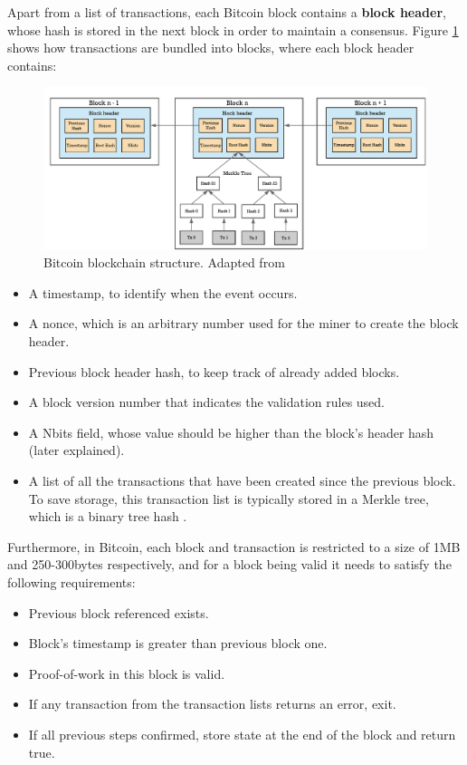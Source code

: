 Apart from a list of transactions, each Bitcoin block contains a \textbf{block header}, whose hash is stored in the next block in order to maintain a consensus. Figure \ref{fig:Bitcoin Blockchain mining} shows how transactions are bundled into blocks, where each block header contains:

\begin{figure}[t]
  	\includegraphics[width=1\linewidth]{gfx/mining}    
  	\caption{Bitcoin blockchain structure. Adapted from \citep{hans2017blockchain}}
  	\label{fig:Bitcoin Blockchain mining}
\end{figure}

\begin{itemize}
	\item A timestamp, to identify when the event occurs.
	\item A nonce, which is an arbitrary number used for the miner to create the block header.
	\item Previous block header hash, to keep track of already added blocks.
	\item A block version number that indicates the validation rules used.
	\item A Nbits field, whose value should be higher than the block's header hash (later explained).
	\item A list of all the transactions that have been created since the previous block. To save storage, this transaction list is typically stored in a Merkle tree, which is a binary tree hash \citep{merkle1987digital}.

\end{itemize}

Furthermore, in Bitcoin, each block and transaction is restricted to a size of 1MB and 250-300bytes respectively, and for a block being valid it needs to satisfy the following requirements:

\begin{itemize}
	\item Previous block referenced exists.
	\item Block's timestamp is greater than previous block one.
	\item Proof-of-work in this block is valid.
	\item If any transaction from the transaction lists returns an error, exit.
	\item If all previous steps confirmed, store state at the end of the block and return true.
\end{itemize}  

